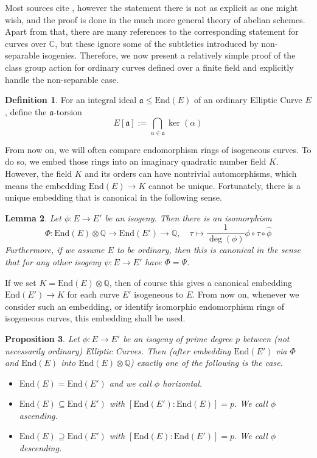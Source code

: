 \documentclass{ociamthesis}
\newcommand{\Q}{\mathbb{Q}}
\newcommand{\C}{\mathbb{C}}
\newcommand{\End}{\mathrm{End}}
\renewcommand{\a}{\mathfrak{a}}
\newtheorem{prop}{Proposition}[section]
\newtheorem{lemma}[prop]{Lemma}
\theoremstyle{definition}
\newtheorem{definition}[prop]{Definition}
\begin{document}
Most sources cite \cite[Thm~4.5]{class_group_action_waterhouse}, however the statement there is not as explicit as one might wish, and the proof is done in the much more general theory of abelian schemes.
Apart from that, there are many references to the corresponding statement for curves over $\C$, but these ignore some of the subtleties introduced by non-separable isogenies. 
Therefore, we now present a relatively simple proof of the class group action for ordinary curves defined over a finite field and explicitly handle the non-separable case.
\begin{definition}
    For an integral ideal $\a \leq \End(E)$ of an ordinary Elliptic Curve $E$, define the $\a$-torsion
    \begin{equation*}
        E[\a] := \bigcap_{\alpha \in \a} \ker(\alpha)
    \end{equation*}
\end{definition}
From now on, we will often compare endomorphism rings of isogeneous curves.
To do so, we embed those rings into an imaginary quadratic number field $K$.
However, the field $K$ and its orders can have nontrivial automorphisms, which means the embedding $\End(E) \to K$ cannot be unique.
Fortunately, there is a unique embedding that is canonical in the following sense.
\begin{lemma}
    Let $\phi: E \to E'$ be an isogeny.
    Then there is an isomorphism
    \begin{equation*}
        \Phi: \End(E) \otimes \Q \to \End(E') \to \Q, \quad \tau \mapsto \frac 1 {\deg(\phi)} \phi \circ \tau \circ \hat{\phi}
    \end{equation*}
    Furthermore, if we assume $E$ to be ordinary, then this is canonical in the sense that for any other isogeny $\psi: E \to E'$ have $\Phi = \Psi$.
\end{lemma}
If we set $K = \End(E) \otimes \Q$, then of course this gives a canonical embedding $\End(E') \to K$ for each curve $E'$ isogeneous to $E$.
From now on, whenever we consider such an embedding, or identify isomorphic endomorphism rings of isogeneous curves, this embedding shall be used.
\begin{prop}
    Let $\phi: E \to E'$ be an isogeny of prime degree $p$ between (not necessarily ordinary) Elliptic Curves.
    Then (after embedding $\End(E')$ via $\Phi$ and $\End(E)$ into $\End(E) \otimes \Q$) exactly one of the following is the case.
    \begin{itemize}
        \item $\End(E) = \End(E')$ and we call $\phi$ \emph{horizontal}.
        \item $\End(E) \subseteq \End(E')$ with $[\End(E') : \End(E)] = p$. We call $\phi$ \emph{ascending}.
        \item $\End(E) \supseteq \End(E')$ with $[\End(E) : \End(E')] = p$. We call $\phi$ \emph{descending}.
    \end{itemize}
\end{prop}
\end{document}
